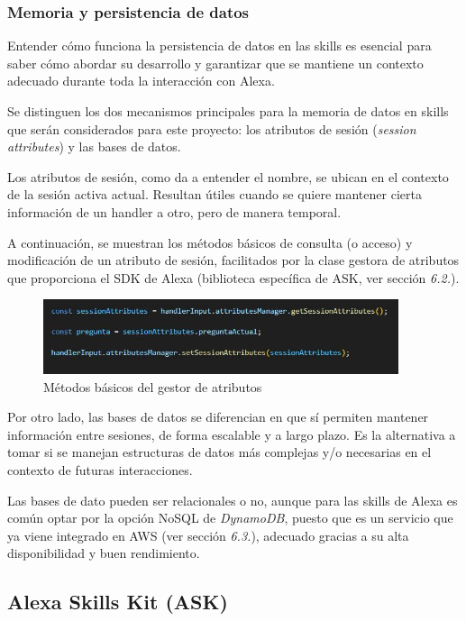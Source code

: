 \subsubsection{Memoria y persistencia de datos}

Entender cómo funciona la persistencia de datos en las skills es esencial para saber cómo abordar su desarrollo y garantizar que se mantiene un contexto adecuado durante toda la interacción con Alexa.

Se distinguen los dos mecanismos principales para la memoria de datos en skills que serán considerados para este proyecto: los atributos de sesión (\textit{session attributes}) y las bases de datos.

Los atributos de sesión, como da a entender el nombre, se ubican en el contexto de la sesión activa actual. Resultan útiles cuando se quiere mantener cierta información de un handler a otro, pero de manera temporal.

A continuación, se muestran los métodos básicos de consulta (o acceso) y modificación de un atributo de sesión, facilitados por la clase gestora de atributos que proporciona el SDK de Alexa (biblioteca específica de ASK, ver sección \textit{6.2.}).

\begin{figure}[H]
	\centering
	\includegraphics[width=0.93\textwidth]{imgs/sesion-atrib.jpg}
	\caption{Métodos básicos del gestor de atributos}
	\label{fig:sesion-atrib}
\end{figure}

Por otro lado, las bases de datos se diferencian en que sí permiten mantener información entre sesiones, de forma escalable y a largo plazo. Es la alternativa a tomar si se manejan estructuras de datos más complejas y/o necesarias en el contexto de futuras interacciones.

Las bases de dato pueden ser relacionales o no, aunque para las skills de Alexa es común optar por la opción NoSQL de \textit{DynamoDB}, puesto que es un servicio que ya viene integrado en AWS (ver sección \textit{6.3.}), adecuado gracias a su alta disponibilidad y buen rendimiento.

\subsection{Alexa Skills Kit (ASK)}

